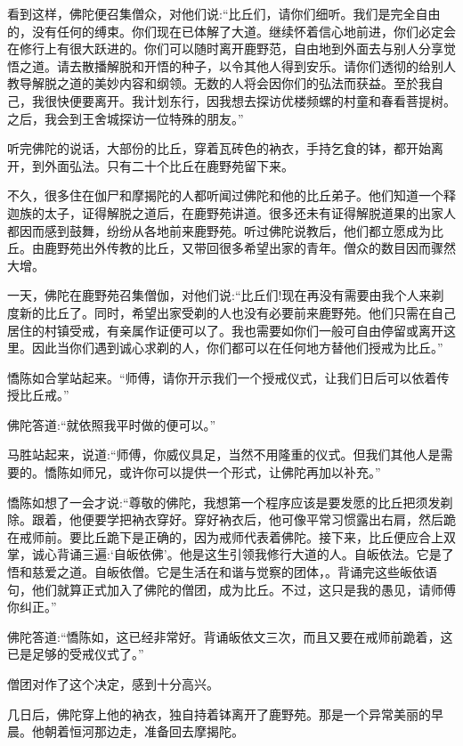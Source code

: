\documentclass[12pt,twoside,openany]{book}
\begin{document}
看到这样，佛陀便召集僧众，对他们说:“比丘们，请你们细听。我们是完全自由的，没有任何的缚束。你们现在已体解了大道。继续怀着信心地前进，你们必定会在修行上有很大跃进的。你们可以随时离开鹿野范，自由地到外面去与别人分享觉悟之道。请去散播解脱和开悟的种子，以令其他人得到安乐。请你们透彻的给别人教导解脱之道的美妙内容和纲领。无数的人将会因你们的弘法而获益。至於我自己，我很快便要离开。我计划东行，因我想去探访优楼频螺的村童和春看菩提树。之后，我会到王舍城探访一位特殊的朋友。”

听完佛陀的说话，大部份的比丘，穿着瓦砖色的衲衣，手持乞食的钵，都开始离开，到外面弘法。只有二十个比丘在鹿野苑留下来。

不久，很多住在伽尸和摩揭陀的人都听闻过佛陀和他的比丘弟子。他们知道一个释迦族的太子，证得解脱之道后，在鹿野苑讲道。很多还未有证得解脱道果的出家人都因而感到鼓舞，纷纷从各地前来鹿野苑。听过佛陀说教后，他们都立愿成为比丘。由鹿野苑出外传教的比丘，又带回很多希望出家的青年。僧众的数目因而骤然大增。

一天，佛陀在鹿野苑召集僧伽，对他们说:“比丘们!现在再没有需要由我个人来剃度新的比丘了。同时，希望出家受剃的人也没有必要前来鹿野苑。他们只需在自己居住的村镇受戒，有亲属作证便可以了。我也需要如你们一般可自由停留或离开这里。因此当你们遇到诚心求剃的人，你们都可以在任何地方替他们授戒为比丘。”

憍陈如合掌站起来。“师傅，请你开示我们一个授戒仪式，让我们日后可以依着传授比丘戒。”

佛陀答道:“就依照我平时做的便可以。”

马胜站起来，说道:“师傅，你威仪具足，当然不用隆重的仪式。但我们其他人是需要的。憍陈如师兄，或许你可以提供一个形式，让佛陀再加以补充。”

憍陈如想了一会才说:“尊敬的佛陀，我想第一个程序应该是要发愿的比丘把须发剃除。跟着，他便要学把衲衣穿好。穿好衲衣后，他可像平常习惯露出右肩，然后跪在戒师前。要比丘跪下是正确的，因为戒师代表着佛陀。接下来，比丘便应合上双掌，诚心背诵三遍:‘自皈依佛’。他是这生引领我修行大道的人。自皈依法。它是了悟和慈爱之道。自皈依僧。它是生活在和谐与觉察的团体，。背诵完这些皈依语句，他们就算正式加入了佛陀的僧团，成为比丘。不过，这只是我的愚见，请师傅你纠正。”

佛陀答道:“憍陈如，这已经非常好。背诵皈依文三次，而且又要在戒师前跪着，这已是足够的受戒仪式了。”

僧团对作了这个决定，感到十分高兴。

几日后，佛陀穿上他的衲衣，独自持着钵离开了鹿野苑。那是一个异常美丽的早晨。他朝着恒河那边走，准备回去摩揭陀。

\end{document}
